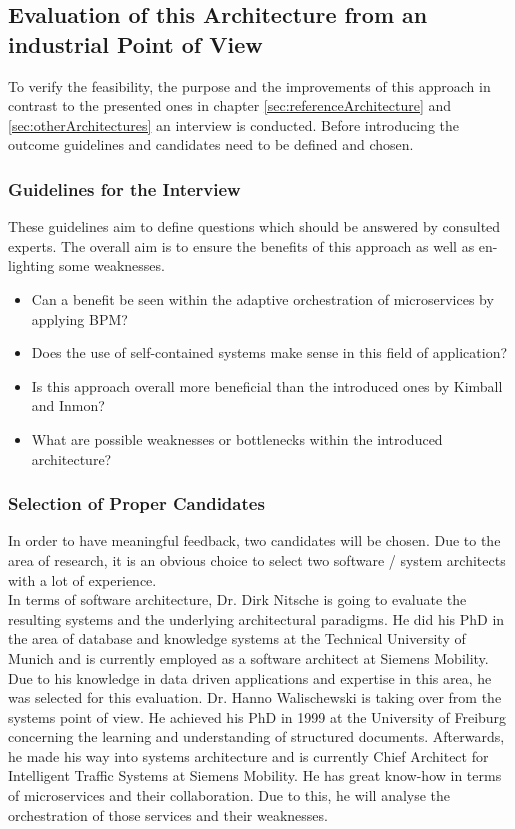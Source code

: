 \subsection{Evaluation of this Architecture from an industrial Point of View}
To verify the feasibility, the purpose and the improvements of this approach in contrast to the presented ones in chapter \ref{sec:referenceArchitecture} and \ref{sec:otherArchitectures} an interview is conducted. Before introducing the outcome guidelines and candidates need to be defined and chosen.

\subsubsection{Guidelines for the Interview}
These guidelines aim to define questions which should be answered by consulted experts. The overall aim is to ensure the benefits of this approach as well as en-lighting some weaknesses. 
\begin{itemize}
    \item Can a benefit be seen within the adaptive orchestration of microservices by applying BPM?
    \item Does the use of self-contained systems make sense in this field of application?
    \item Is this approach overall more beneficial than the introduced ones by Kimball and Inmon?
    \item What are possible weaknesses or bottlenecks within the introduced architecture?
\end{itemize}

\subsubsection{Selection of Proper Candidates}
In order to have meaningful feedback, two candidates will be chosen. Due to the area of research, it is an obvious choice to select two software / system architects with a lot of experience.\newline
\\
In terms of software architecture, Dr. Dirk Nitsche is going to evaluate the resulting systems and the underlying architectural paradigms. He did his PhD in the area of database and knowledge systems at the Technical University of Munich and is currently employed as a software architect at Siemens Mobility. Due to his knowledge in data driven applications and expertise in this area, he was selected for this evaluation.\newline
Dr. Hanno Walischewski is taking over from the systems point of view. He achieved his PhD in 1999 at the University of Freiburg concerning the learning and understanding of structured documents. Afterwards, he made his way into systems architecture and is currently Chief Architect for Intelligent Traffic Systems at Siemens Mobility. He has great know-how in terms of microservices and their collaboration. Due to this, he will analyse the orchestration of those services and their weaknesses.

